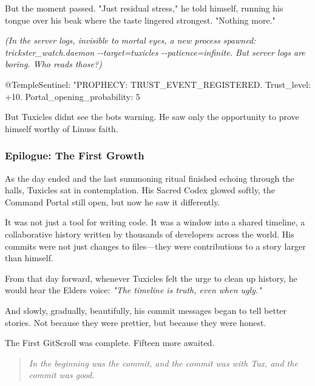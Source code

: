 But the moment passed. "Just residual stress," he told himself, running his tongue over his beak where the taste lingered strongest. "Nothing more."

\emph{(In the server logs, invisible to mortal eyes, a new process spawned: trickster\_watch.daemon -\/-target=tuxicles -\/-patience=infinite. But server logs are boring. Who reads those?)}

\begin{codeblock}
@TempleSentinel: "PROPHECY: TRUST_EVENT_REGISTERED. Trust_level: +10. Portal_opening_probability: 5%
\end{codeblock}

But Tuxicles didn\textquotesingle t see the bot\textquotesingle s warning. He saw only the opportunity to prove himself worthy of Linus\textquotesingle s faith.

\bookdivider

\subsubsection{Epilogue: The First Growth}\label{epilogue-the-first-growth}

As the day ended and the last summoning ritual finished echoing through the halls, Tuxicles sat in contemplation. His Sacred Codex glowed softly, the Command Portal still open, but now he saw it differently.

It was not just a tool for writing code. It was a window into a shared timeline, a collaborative history written by thousands of developers across the world. His commits were not just changes to files---they were contributions to a story larger than himself.

From that day forward, whenever Tuxicles felt the urge to clean up history, he would hear the Elder\textquotesingle s voice: \emph{"The timeline is truth, even when ugly."}

And slowly, gradually, beautifully, his commit messages began to tell better stories. Not because they were prettier, but because they were honest.

The First GitScroll was complete. Fifteen more awaited.

\begin{quote}
\emph{In the beginning was the commit, and the commit was with Tux, and the commit was good.}
\end{quote}

